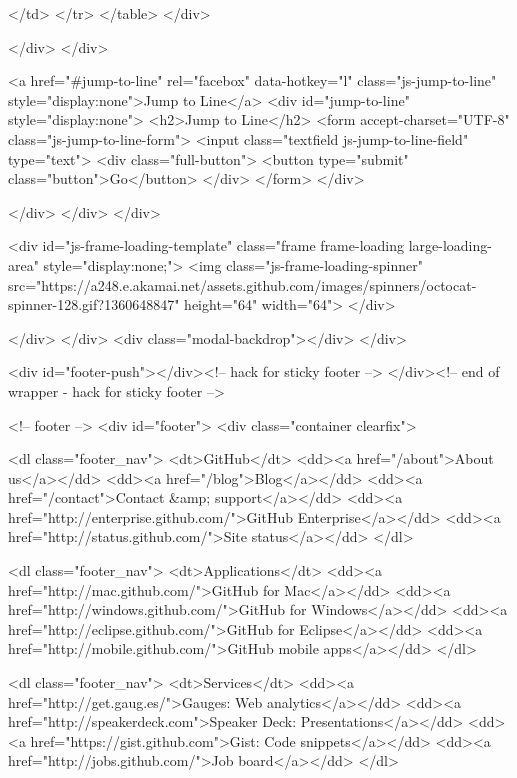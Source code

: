           </td>
        </tr>
      </table>
  </div>

          </div>
        </div>

        <a href="#jump-to-line" rel="facebox" data-hotkey="l" class="js-jump-to-line" style="display:none">Jump to Line</a>
        <div id="jump-to-line" style="display:none">
          <h2>Jump to Line</h2>
          <form accept-charset="UTF-8" class="js-jump-to-line-form">
            <input class="textfield js-jump-to-line-field" type="text">
            <div class="full-button">
              <button type="submit" class="button">Go</button>
            </div>
          </form>
        </div>

      </div>
    </div>
</div>

<div id="js-frame-loading-template" class="frame frame-loading large-loading-area" style="display:none;">
  <img class="js-frame-loading-spinner" src="https://a248.e.akamai.net/assets.github.com/images/spinners/octocat-spinner-128.gif?1360648847" height="64" width="64">
</div>


        </div>
      </div>
      <div class="modal-backdrop"></div>
    </div>

      <div id="footer-push"></div><!-- hack for sticky footer -->
    </div><!-- end of wrapper - hack for sticky footer -->

      <!-- footer -->
      <div id="footer">
  <div class="container clearfix">

      <dl class="footer_nav">
        <dt>GitHub</dt>
        <dd><a href="/about">About us</a></dd>
        <dd><a href="/blog">Blog</a></dd>
        <dd><a href="/contact">Contact &amp; support</a></dd>
        <dd><a href="http://enterprise.github.com/">GitHub Enterprise</a></dd>
        <dd><a href="http://status.github.com/">Site status</a></dd>
      </dl>

      <dl class="footer_nav">
        <dt>Applications</dt>
        <dd><a href="http://mac.github.com/">GitHub for Mac</a></dd>
        <dd><a href="http://windows.github.com/">GitHub for Windows</a></dd>
        <dd><a href="http://eclipse.github.com/">GitHub for Eclipse</a></dd>
        <dd><a href="http://mobile.github.com/">GitHub mobile apps</a></dd>
      </dl>

      <dl class="footer_nav">
        <dt>Services</dt>
        <dd><a href="http://get.gaug.es/">Gauges: Web analytics</a></dd>
        <dd><a href="http://speakerdeck.com">Speaker Deck: Presentations</a></dd>
        <dd><a href="https://gist.github.com">Gist: Code snippets</a></dd>
        <dd><a href="http://jobs.github.com/">Job board</a></dd>
      </dl>

